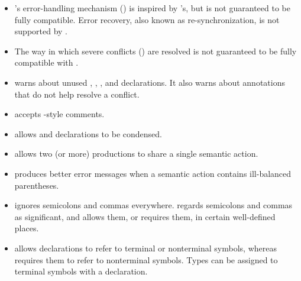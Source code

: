 \documentclass[onecolumn,11pt,nocopyrightspace,preprint]{sigplanconf}
\begin{document}
\begin{itemize}
\item \menhir's error-handling mechanism () is inspired
      by \ocamlyacc's, but is not guaranteed to be fully
      compatible. Error recovery, also known as re-synchronization, is not
      supported by \menhir.

\item The way in which severe conflicts () are resolved
      is not guaranteed to be fully compatible with \ocamlyacc.

\item \menhir warns about unused \dtoken, \dnonassoc, \dleft, and \dright
      declarations. It also warns about \dprec annotations that do not
      help resolve a conflict.

\item \menhir accepts \ocaml-style comments.

\item \menhir allows \dstart and \dtype declarations to be condensed.

\item \menhir allows two (or more) productions to share a single semantic action.

\item \menhir produces better error messages when a semantic action
      contains ill-balanced parentheses.


\item \ocamlyacc ignores semicolons and commas everywhere. \menhir regards
      semicolons and commas as significant, and allows them, or requires them,
      in certain well-defined places.


\item \ocamlyacc allows \dtype declarations to refer to terminal or nonterminal
      symbols, whereas \menhir requires them to refer to nonterminal symbols.
      Types can be assigned to terminal symbols with a \dtoken declaration.

\end{itemize}

\end{document}
